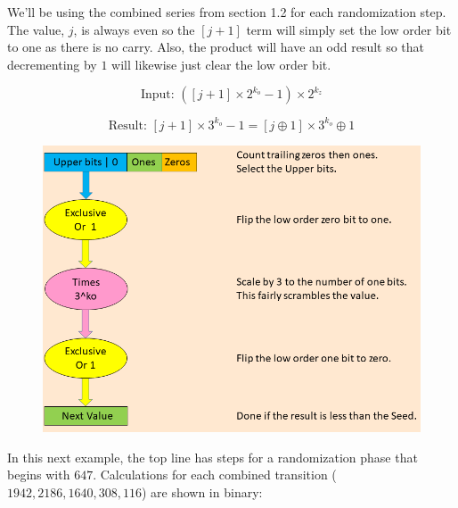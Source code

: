 \documentclass[letterpaper]{article}
\begin{document}
\begin{multicols}{2}
    We'll be using the combined series from section 1.2 for each randomization step. The value, $j$, is always even so the $[j + 1]$ term will simply set the low order bit to one as there is no carry. Also, the product will have an odd result so that decrementing by $1$ will likewise just clear the low order bit.

    \[
        \text{Input: } ([j + 1] \times 2^{k_o} - 1) \times 2^{k_z}
    \]

    \[
        \text{Result: } [j + 1] \times 3^{k_o} - 1 = [j \oplus 1] \times 3^{k_o} \oplus 1
    \]



    \begin{figure}
        \includegraphics[width=\textwidth]{collatz_even}
        \caption{}
    \end{figure}

    In this next example, the top line has steps for a randomization phase that begins with $647$. Calculations for each combined transition ($1942, 2186, 1640, 308, 116$) are shown in binary:


\end{multicols}
\end{document}
